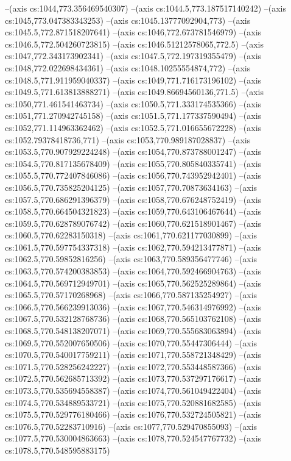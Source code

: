 --(axis cs:1044,773.356469540307)
--(axis cs:1044.5,773.187517140242)
--(axis cs:1045,773.047383343253)
--(axis cs:1045.13777092904,773)
--(axis cs:1045.5,772.871518207641)
--(axis cs:1046,772.673781546979)
--(axis cs:1046.5,772.504260723815)
--(axis cs:1046.51212578065,772.5)
--(axis cs:1047,772.343173902341)
--(axis cs:1047.5,772.197319355479)
--(axis cs:1048,772.022698434361)
--(axis cs:1048.10255554874,772)
--(axis cs:1048.5,771.911959040337)
--(axis cs:1049,771.716173196102)
--(axis cs:1049.5,771.613813888271)
--(axis cs:1049.86694560136,771.5)
--(axis cs:1050,771.461541463734)
--(axis cs:1050.5,771.333174535366)
--(axis cs:1051,771.270942745158)
--(axis cs:1051.5,771.177337590494)
--(axis cs:1052,771.114963362462)
--(axis cs:1052.5,771.016655672228)
--(axis cs:1052.79378418736,771)
--(axis cs:1053,770.989187028837)
--(axis cs:1053.5,770.907929224248)
--(axis cs:1054,770.873788001247)
--(axis cs:1054.5,770.817135678409)
--(axis cs:1055,770.805840335741)
--(axis cs:1055.5,770.772407846086)
--(axis cs:1056,770.743952942401)
--(axis cs:1056.5,770.735825204125)
--(axis cs:1057,770.70873634163)
--(axis cs:1057.5,770.686291396379)
--(axis cs:1058,770.676248752419)
--(axis cs:1058.5,770.664504321823)
--(axis cs:1059,770.643106467644)
--(axis cs:1059.5,770.628789076742)
--(axis cs:1060,770.621518901467)
--(axis cs:1060.5,770.62283150318)
--(axis cs:1061,770.621177030899)
--(axis cs:1061.5,770.597754337318)
--(axis cs:1062,770.594213477871)
--(axis cs:1062.5,770.59852816256)
--(axis cs:1063,770.589356477746)
--(axis cs:1063.5,770.574200383853)
--(axis cs:1064,770.592466904763)
--(axis cs:1064.5,770.569712949701)
--(axis cs:1065,770.562525289864)
--(axis cs:1065.5,770.57170268968)
--(axis cs:1066,770.587135254927)
--(axis cs:1066.5,770.566239913036)
--(axis cs:1067,770.546314976992)
--(axis cs:1067.5,770.532128768736)
--(axis cs:1068,770.565103762108)
--(axis cs:1068.5,770.548138207071)
--(axis cs:1069,770.555683063894)
--(axis cs:1069.5,770.552007650506)
--(axis cs:1070,770.55447306444)
--(axis cs:1070.5,770.540017759211)
--(axis cs:1071,770.558721348429)
--(axis cs:1071.5,770.528256242227)
--(axis cs:1072,770.553448587366)
--(axis cs:1072.5,770.562685713392)
--(axis cs:1073,770.537297176617)
--(axis cs:1073.5,770.535694558387)
--(axis cs:1074,770.561049422404)
--(axis cs:1074.5,770.534889533721)
--(axis cs:1075,770.520881682585)
--(axis cs:1075.5,770.529776180466)
--(axis cs:1076,770.532724505821)
--(axis cs:1076.5,770.52283710916)
--(axis cs:1077,770.529470855093)
--(axis cs:1077.5,770.530004863663)
--(axis cs:1078,770.524547767732)
--(axis cs:1078.5,770.548595883175)
